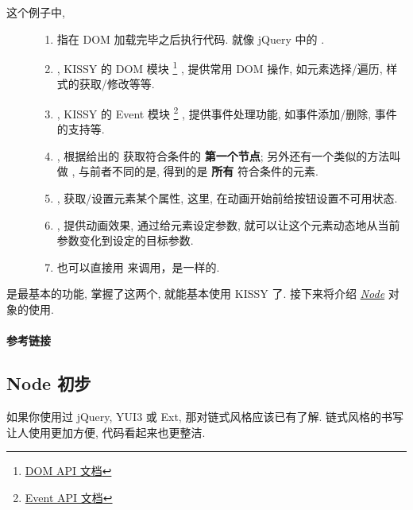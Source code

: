 \documentclass[letterpaper,10pt,english]{sphinxmanual}
\begin{document}
\begin{description}
\item[{这个例子中,}] \leavevmode\begin{enumerate}
\item {}
 指在 DOM 加载完毕之后执行代码. 就像 jQuery 中的 .

\item {}
, KISSY 的 DOM 模块 \footnote{
\href{http://kissyteam.github.com/kissy/docs/dom/index.html}{DOM API 文档}
} , 提供常用 DOM 操作, 如元素选择/遍历, 样式的获取/修改等等.

\item {}
, KISSY 的 Event 模块 \footnote{
\href{http://kissyteam.github.com/kissy/docs/event/index.html}{Event API 文档}
} , 提供事件处理功能, 如事件添加/删除,  事件的支持等.

\item {}
, 根据给出的  获取符合条件的 \textbf{第一个节点}; 另外还有一个类似的方法叫做  , 与前者不同的是, 得到的是 \textbf{所有} 符合条件的元素.

\item {}
, 获取/设置元素某个属性, 这里, 在动画开始前给按钮设置不可用状态.

\item {}
, 提供动画效果, 通过给元素设定参数, 就可以让这个元素动态地从当前参数变化到设定的目标参数.

\item {}
 也可以直接用  来调用，是一样的.

\end{enumerate}

\end{description}

 是最基本的功能, 掌握了这两个, 就能基本使用 KISSY 了.
接下来将介绍 {\hyperref[quickstart/node:usenode]{\emph{Node}}} 对象的使用.
\paragraph{参考链接}


\subsection{Node 初步}
\label{quickstart/node:node}\label{quickstart/node::doc}\label{quickstart/node:usenode}
如果你使用过 jQuery, YUI3 或 Ext, 那对链式风格应该已有了解. 链式风格的书写让人使用更加方便, 代码看起来也更整洁.
\end{document}
